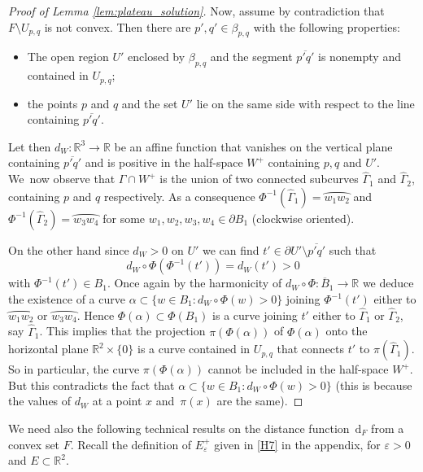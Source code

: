 \documentclass[JEP,XML,SOM,Unicode, NoFloatCountersInSection,published]{cedram}
\newcommand{\R}{\mathbb{R}}
\let\arc\wideparen
\let\eps\varepsilon
\newcommand{\di}{\,\mathrm{d}}
\theoremstyle{definition}
\begin{document}
\begin{proof}[Proof of Lemma \ref{lem:plateau_solution}]
Now, assume by contradiction that $F\setminus U_{p,q}$ is not convex. Then there are $p',q'\in\beta_{p,q}$ with the following properties:
\begin{itemize}
\item The open region $U'$ enclosed by $\beta_{p,q}$ and the segment $\overline{p'q'}$ is nonempty and contained in $U_{p,q}$;
\item the points $p$ and $q$ and the set $U'$ lie on the same side with respect to the line containing $\overline{p'q'}$.
\end{itemize}
Let then $d_W\colon\R^3\to\R$ be an affine function that vanishes on the vertical plane containing $\overline{p'q'}$ and is positive in the half-space $W^+$ containing $p,q$ and $U'$. We~now observe that $\Gamma\cap W^+$ is
the union of two connected subcurves $\widehat\Gamma_1$ and $\widehat\Gamma_2$, containing $p$ and $q$ respectively. As a consequence $\Phi^{-1}(\widehat\Gamma_1)=\arc{w_1w_2}$ and $\Phi^{-1}(\widehat\Gamma_2)=\arc{w_3w_4}$ for some $w_1,w_2,w_3,w_4\in\partial B_1$ (clockwise oriented).

On the other hand since $d_W>0$ on $U'$ we can find $t'\in\partial U'\setminus \overline{p'q'}$ such that
\[
d_W\circ\Phi(\Phi^{-1}(t'))=d_W(t')>0
\]
with $\Phi^{-1}(t')\in B_1$.
Once again by the harmonicity of $d_W\circ\Phi\colon\overline{B}_1\to\R$ we deduce the existence of a curve $\alpha\subset\{w\in B_1\colon d_W\circ\Phi(w)>0\}$ joining $\Phi^{-1}(t')$ either to $\arc{w_1w_2}$ or $\arc{w_3w_4}$. Hence $\Phi(\alpha)\subset \Phi( B_1)$ is a curve joining $t'$ either to $\widehat\Gamma_1$ or $\widehat\Gamma_2$, say $\widehat\Gamma_1$.
This implies that the projection $\pi(\Phi(\alpha))$ of $\Phi(\alpha)$ onto the horizontal plane $\R^2\times\{0\}$ is a curve contained in $U_{p,q}$ that connects $t'$ to $\pi(\widehat\Gamma_1)$. So in particular, the curve $\pi(\Phi(\alpha))$ cannot be included in the half-space $W^+$. But this contradicts the fact that $\alpha\subset\{w\in B_1\colon d_W\circ\Phi(w)>0\}$ (this is because the values of $d_W$ at a point $x$ and~$\pi(x)$ are the same).
\end{proof}

We need also the following technical results on the distance function
$\di_F$ from a convex set $F$.
Recall the definition of $E^+_\eps$ given in \ref{H7} in the appendix,
for $\eps>0$ and $E\subset\R^2$.
\end{document}
